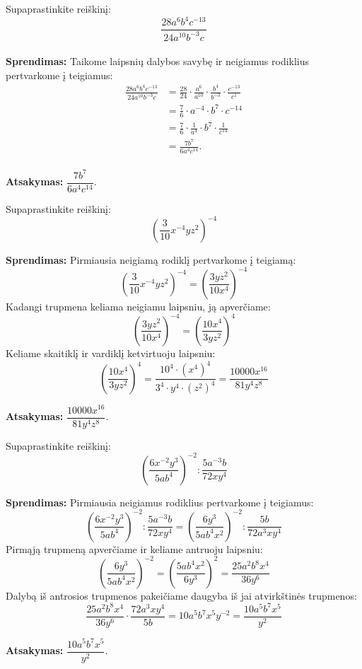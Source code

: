 \documentclass[11pt,a4paper]{scrartcl}
\begin{document}
\begin{example}
Supaprastinkite reiškinį:
$$\frac{28a^6b^4c^{-13}}{24a^{10}b^{-3}c}$$\\
\textbf{Sprendimas:} Taikome laipsnių dalybos savybę ir neigiamus rodiklius pertvarkome į teigiamus:
\[
\begin{aligned}
\frac{28a^6b^4c^{-13}}{24a^{10}b^{-3}c}
&= \frac{28}{24} \cdot \frac{a^6}{a^{10}} \cdot \frac{b^4}{b^{-3}} \cdot \frac{c^{-13}}{c^1} \\
&= \frac{7}{6} \cdot a^{-4} \cdot b^7 \cdot c^{-14} \\
&= \frac{7}{6} \cdot \frac{1}{a^4} \cdot b^7 \cdot \frac{1}{c^{14}} \\
&= \frac{7b^7}{6a^4c^{14}}.
\end{aligned}
\]\\
\textbf{Atsakymas:} $\dfrac{7b^7}{6a^4c^{14}}$.
\end{example}

\begin{example}
Supaprastinkite reiškinį:
$$\left(\frac{3}{10}x^{-4}yz^2\right)^{-4}$$

\textbf{Sprendimas:} Pirmiausia neigiamą rodiklį pertvarkome į teigiamą:
$$\left(\frac{3}{10}x^{-4}yz^2\right)^{-4} = \left(\frac{3yz^2}{10x^4}\right)^{-4}$$
Kadangi trupmena keliama neigiamu laipsniu, ją apverčiame:
$$\left(\frac{3yz^2}{10x^4}\right)^{-4} = \left(\frac{10x^4}{3yz^2}\right)^4$$
Keliame skaitiklį ir vardiklį ketvirtuoju laipsniu:
$$\left(\frac{10x^4}{3yz^2}\right)^4 = \frac{10^4 \cdot (x^4)^4}{3^4 \cdot y^4 \cdot (z^2)^4} = \frac{10000x^{16}}{81y^4z^8}$$

\textbf{Atsakymas:} $\dfrac{10000x^{16}}{81y^4z^8}$.
\end{example}

\begin{example}
Supaprastinkite reiškinį:
$$\left(\frac{6x^{-2}y^3}{5ab^4}\right)^{-2} : \frac{5a^{-3}b}{72xy^4}$$

\textbf{Sprendimas:} Pirmiausia neigiamus rodiklius pertvarkome į teigiamus:
$$\left(\frac{6x^{-2}y^3}{5ab^4}\right)^{-2} : \frac{5a^{-3}b}{72xy^4} = \left(\frac{6y^3}{5ab^4x^2}\right)^{-2} : \frac{5b}{72a^3xy^4}$$
Pirmąją trupmeną apverčiame ir keliame antruoju laipsniu:
$$\left(\frac{6y^3}{5ab^4x^2}\right)^{-2} = \left(\frac{5ab^4x^2}{6y^3}\right)^2 = \frac{25a^2b^8x^4}{36y^6}$$
Dalybą iš antrosios trupmenos pakeičiame daugyba iš jai atvirkštinės trupmenos:
$$\frac{25a^2b^8x^4}{36y^6} \cdot \frac{72a^3xy^4}{5b} = 10a^5b^7x^5y^{-2} = \frac{10a^5b^7x^5}{y^2}$$

\textbf{Atsakymas:} $\dfrac{10a^5b^7x^5}{y^2}$.
\end{example}
\end{document}
